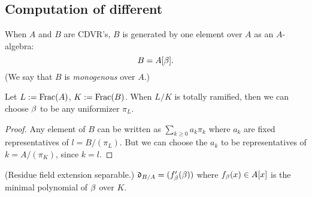 \subsection{Computation of different}
\begin{pr}
When $A$ and $B$ are CDVR's, $B$ is generated by one element over $A$ as an $A$-algebra:
\[
B=A[\beta].
\]
(We say that $B$ is {\it monogenous} over $A$.)

Let $L:=\operatorname{Frac}(A)$, $K:=\operatorname{Frac}(B)$. When $L/K$ is totally ramified, then we can choose $\beta$ to be any uniformizer $\pi_L$.
\end{pr}
\begin{proof}
Any element of $B$ can be written as $\sum_{k\ge 0} a_k\pi_k$ where $a_k$ are fixed representatives of $l=B/(\pi_L)$. But we can choose the $a_k$ to be representatives of $k=A/(\pi_K)$, since $k=l$.
\end{proof}
\begin{thm}
(Residue field extension separable.) 
$\mathfrak {\mathfrak d}_{B/A}=(f'_{\beta}(\beta))$ where $f_{\beta}(x)\in A[x]$ is the minimal polynomial of $\beta$ over $K$.
\end{thm}
